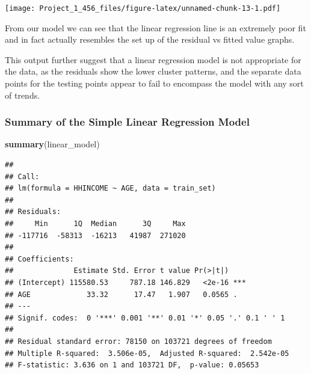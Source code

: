 \documentclass[
]{article}
\newenvironment{Shaded}{\begin{snugshade}}{\end{snugshade}}
\newcommand{\AttributeTok}[1]{\textcolor[rgb]{0.13,0.29,0.53}{#1}}
\newcommand{\CommentTok}[1]{\textcolor[rgb]{0.56,0.35,0.01}{\textit{#1}}}
\newcommand{\FunctionTok}[1]{\textcolor[rgb]{0.13,0.29,0.53}{\textbf{#1}}}
\newcommand{\NormalTok}[1]{#1}
\newcommand{\OtherTok}[1]{\textcolor[rgb]{0.56,0.35,0.01}{#1}}
\newcommand{\SpecialCharTok}[1]{\textcolor[rgb]{0.81,0.36,0.00}{\textbf{#1}}}
\newcommand{\StringTok}[1]{\textcolor[rgb]{0.31,0.60,0.02}{#1}}
\begin{document}
\begin{Shaded}
\end{Shaded}

\texttt{[image: Project\_1\_456\_files/figure-latex/unnamed-chunk-13-1.pdf]}

From our model we can see that the linear regression line is an
extremely poor fit and in fact actually resembles the set up of the
residual vs fitted value graphs.

This output further suggest that a linear regression model is not
appropriate for the data, as the residuals show the lower cluster
patterns, and the separate data points for the testing points appear to
fail to encompass the model with any sort of trends.

\subsubsection{Summary of the Simple Linear Regression
Model}\label{summary-of-the-simple-linear-regression-model}

\begin{Shaded}
\begin{Highlighting}[]
\FunctionTok{summary}\NormalTok{(linear\_model)}
\end{Highlighting}
\end{Shaded}

\begin{verbatim}
## 
## Call:
## lm(formula = HHINCOME ~ AGE, data = train_set)
## 
## Residuals:
##     Min      1Q  Median      3Q     Max 
## -117716  -58313  -16213   41987  271020 
## 
## Coefficients:
##              Estimate Std. Error t value Pr(>|t|)    
## (Intercept) 115580.53     787.18 146.829   <2e-16 ***
## AGE             33.32      17.47   1.907   0.0565 .  
## ---
## Signif. codes:  0 '***' 0.001 '**' 0.01 '*' 0.05 '.' 0.1 ' ' 1
## 
## Residual standard error: 78150 on 103721 degrees of freedom
## Multiple R-squared:  3.506e-05,  Adjusted R-squared:  2.542e-05 
## F-statistic: 3.636 on 1 and 103721 DF,  p-value: 0.05653
\end{verbatim}
\end{document}
